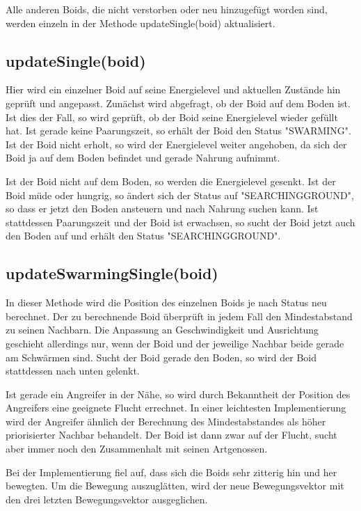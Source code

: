 \documentclass[draft=false
              ,paper=a4
              ,twoside=false
              ,fontsize=11pt
              ,headsepline
              ,BCOR10mm
              ,DIV11
              ,bibtotoc
              ,liststotoc
              ]{scrbook}
\begin{document}
Alle anderen Boids, die nicht verstorben oder neu hinzugefügt worden sind, werden einzeln in der Methode updateSingle(boid) aktualisiert.

\subsection{updateSingle(boid)}
 Hier wird ein einzelner Boid auf seine Energielevel und aktuellen Zustände hin geprüft und angepasst. Zunächst wird abgefragt, ob der Boid auf dem Boden ist. Ist dies der Fall, so wird geprüft, ob der Boid seine Energielevel wieder gefüllt hat. Ist gerade keine Paarungszeit, so erhält der Boid den Status "{}SWARMING"{}. Ist der Boid nicht erholt, so wird der Energielevel weiter angehoben, da sich der Boid ja auf dem Boden befindet und gerade Nahrung aufnimmt.

Ist der Boid nicht auf dem Boden, so werden die Energielevel gesenkt. Ist der Boid müde oder hungrig, so ändert sich der Status auf "{}SEARCHINGGROUND"{}, so dass er jetzt den Boden ansteuern und nach Nahrung suchen kann.
Ist stattdessen Paarungszeit und der Boid ist erwachsen, so sucht der Boid jetzt auch den Boden auf und erhält den Status "{}SEARCHINGGROUND"{}.

\subsection{updateSwarmingSingle(boid)}\label{swarmmethod}
In dieser Methode wird die Position des einzelnen Boids je nach Status neu berechnet. Der zu berechnende Boid überprüft in jedem Fall den Mindestabstand zu seinen Nachbarn. Die Anpassung an Geschwindigkeit und Ausrichtung geschieht allerdings nur, wenn der Boid und der jeweilige Nachbar beide gerade am Schwärmen sind. Sucht der Boid gerade den Boden, so wird der Boid stattdessen nach unten gelenkt.

Ist gerade ein Angreifer in der Nähe, so wird durch Bekanntheit der Position des Angreifers eine geeignete Flucht errechnet. In einer leichtesten Implementierung wird der Angreifer ähnlich der Berechnung des Mindestabstandes als höher priorisierter Nachbar behandelt. Der Boid ist dann zwar auf der Flucht, sucht aber immer noch den Zusammenhalt mit seinen Artgenossen.

Bei der Implementierung fiel auf, dass sich die Boids sehr zitterig hin und her bewegten. Um die Bewegung auszuglätten, wird der neue Bewegungsvektor mit den drei letzten Bewegungsvektor ausgeglichen.
\end{document}
